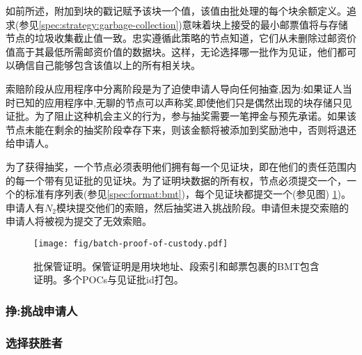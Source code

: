 如前所述，附加到块的戳记赋予该块一个值，该值由批处理的每个块余额定义。追求(参见\ref{spec:strategy:garbage-collection})意味着块上接受的最小邮票值将与存储节点的垃圾收集截止值一致。忠实遵循此策略的节点知道，它们从未删除过邮资价值高于其最低所需邮资价值的数据块。这样，无论选择哪一批作为见证，他们都可以确信自己能够包含该值以上的所有相关块。

索赔阶段从应用程序中分离阶段是为了迫使申请人导向任何抽查,因为:如果证人当时已知的应用程序中,无聊的节点可以声称奖,即使他们只是偶然出现的块存储只见证批。为了阻止这种机会主义的行为，参与抽奖需要一笔押金与预先承诺。如果该节点未能在剩余的抽奖阶段幸存下来，则该金额将被添加到奖励池中，否则将退还给申请人。

为了获得抽奖，一个节点必须表明他们拥有每一个见证块，即在他们的责任范围内的每一个带有见证批的见证块。为了证明块数据的所有权，节点必须提交一个，一个的标准有序列表(参见\ref{spec:format:bmt})，每个见证块都提交一个(参见图) 
\ref{fig:batch-proof-of-custody})。申请人有$N_2$模块提交他们的索赔，然后抽奖进入挑战阶段。申请但未提交索赔的申请人将被视为提交了无效索赔。   


\begin{figure}[htbp]
  \centering
   \texttt{[image: fig/batch-proof-of-custody.pdf]}
  \caption[批保管证明\statusgreen]{批保管证明。保管证明是用块地址、段索引和邮票包裹的BMT包含证明。多个POCs与见证批id打包。}
  \label{fig:batch-proof-of-custody}
\end{figure}

\subsubsection{挣:挑战申请人}


\subsubsection{选择获胜者}

